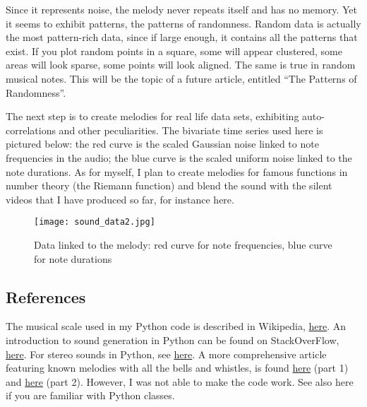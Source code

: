 \documentclass[oneside,10pt]{book}
\begin{document}
Since it represents noise, the melody never repeats itself and has no memory. Yet it seems to exhibit patterns, the patterns of randomness. Random data is actually the most pattern-rich data, since if large enough, it contains all the patterns that exist. If you plot random points in a square, some will appear clustered, some areas will look sparse, some points will look aligned. The same is true in random musical notes. This will be the topic of a future article, entitled “The Patterns of Randomness”.

The next step is to create melodies for real life data sets, exhibiting auto-correlations and other peculiarities. The bivariate time series used here is pictured below: the red curve is the scaled Gaussian noise linked to note frequencies in the audio; the blue curve is the scaled uniform noise linked to the note durations. As for myself, I plan to create melodies for famous functions in number theory (the Riemann function) and blend the sound with the silent videos that I have produced so far, for instance here.


\begin{figure}%
\centering
\texttt{[image: sound\_data2.jpg]}  
\caption{Data linked to the melody: red curve for note frequencies, blue curve for note durations}
\label{fig:sound}
\end{figure}



\subsection{References}
The musical scale used in my Python code is described in Wikipedia, \href{https://en.wikipedia.org/wiki/Piano_key_frequencies}{here}. An introduction to sound generation in Python can be found on StackOverFlow, \href{https://stackoverflow.com/questions/40782159/writing-wav-file-using-python-numpy-array-and-wave-module}{here}. For stereo sounds in Python, see \href{https://www.tutorialspoint.com/read-and-write-wav-files-using-python-wave}{here}. A more comprehensive article featuring known melodies with all the bells and whistles, is found \href{https://towardsdatascience.com/music-in-python-2f054deb41f4}{here} (part 1) and \href{https://towardsdatascience.com/music-in-python-part-2-4f115be3c781}{here} (part 2). However, I was not able to make the code work. See also here if you are familiar with  Python classes.
\end{document}
